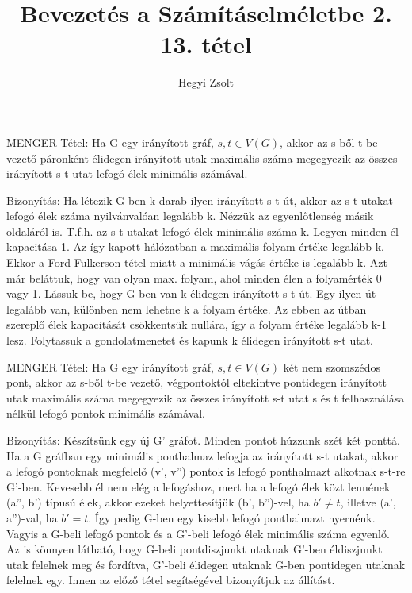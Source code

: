 \documentclass[]{article}
\title{Bevezetés a Számításelméletbe 2.\\{\large 13. tétel}}
\author{Hegyi Zsolt}
\begin{document}
\maketitle
\begin{framed}
MENGER Tétel: Ha G egy irányított gráf, $s,t\in V(G)$, akkor az s-ből t-be vezető páronként élidegen irányított utak maximális száma megegyezik az összes irányított s-t utat lefogó élek minimális számával.
\end{framed}
\begin{leftbar}
Bizonyítás: Ha létezik G-ben k darab ilyen irányított s-t út, akkor az s-t utakat lefogó élek száma nyilvánvalóan legalább k. Nézzük az egyenlőtlenség másik oldaláról is. T.f.h. az s-t utakat lefogó élek minimális száma k. Legyen minden él kapacitása 1. Az így kapott hálózatban a maximális folyam értéke legalább k. Ekkor a Ford-Fulkerson tétel miatt a minimális vágás értéke is legalább k. Azt már beláttuk, hogy van olyan max. folyam, ahol minden élen a folyamérték 0 vagy 1. Lássuk be, hogy G-ben van k élidegen irányított s-t út. Egy ilyen út legalább van, különben nem lehetne k a folyam értéke. Az ebben az útban szereplő élek kapacitását csökkentsük nullára, így a folyam értéke legalább k-1 lesz. Folytassuk a gondolatmenetet és kapunk k élidegen irányított s-t utat.
\end{leftbar}
\begin{framed}
MENGER Tétel: Ha G egy irányított gráf, $s,t\in V(G)$ két nem szomszédos pont, akkor az s-ből t-be vezető, végpontoktól eltekintve pontidegen irányított utak maximális száma megegyezik az összes irányított s-t utat s és t felhasználása nélkül lefogó pontok minimális számával.
\end{framed}
\begin{leftbar}
Bizonyítás: Készítsünk egy új G' gráfot. Minden pontot húzzunk szét két ponttá. Ha a G gráfban egy minimális ponthalmaz lefogja az irányított s-t utakat, akkor a lefogó pontoknak megfelelő (v', v'') pontok is lefogó ponthalmazt alkotnak s-t-re G'-ben. Kevesebb él nem elég a lefogáshoz, mert ha a lefogó élek közt lennének (a'', b') típusú élek, akkor ezeket helyettesítjük (b', b'')-vel, ha $b' \neq t$, illetve (a', a'')-val, ha $b' = t$. Így pedig G-ben egy kisebb lefogó ponthalmazt nyernénk. Vagyis a G-beli lefogó pontok és a G'-beli lefogó élek minimális száma egyenlő. Az is könnyen látható, hogy G-beli pontdiszjunkt utaknak G'-ben éldiszjunkt utak felelnek meg és fordítva, G'-beli élidegen utaknak G-ben pontidegen utaknak felelnek egy. Innen az előző tétel segítségével bizonyítjuk az állítást.
\end{leftbar}
\end{document}

